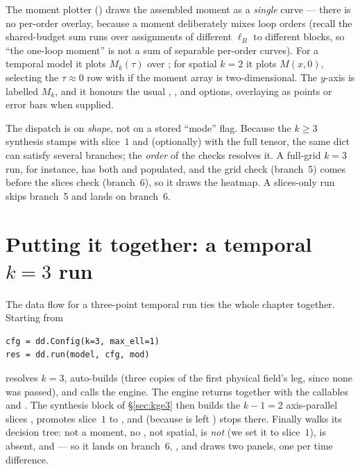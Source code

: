 The moment plotter  () draws
the assembled moment as a \emph{single} curve --- there is no per-order overlay,
because a moment deliberately mixes loop orders (recall the shared-budget sum runs
over assignments of different $\ell_B$ to different blocks, so ``the one-loop
moment'' is not a sum of separable per-order curves). For a temporal model it plots
$M_k(\tau)$ over ; for spatial $k=2$ it plots $M(x,0)$, selecting
the $\tau\approx0$ row with  if the moment array is
two-dimensional. The $y$-axis is labelled $M_k$, and it honours the usual
, , and  options, overlaying  as points
or error bars when supplied.

\begin{note}
The dispatch is on \emph{shape}, not on a stored ``mode'' flag. Because the
$k\ge3$ synthesis stamps  with slice~$1$ and (optionally)
 with the full tensor, the same dict can satisfy several
branches; the \emph{order} of the checks resolves it. A full-grid $k=3$ run, for
instance, has both  and  populated, and the
grid check (branch~5) comes before the slices check (branch~6), so it draws the
heatmap. A slices-only run skips branch~5 and lands on branch~6.
\end{note}

\section{Putting it together: a temporal \texorpdfstring{$k=3$}{k=3} run}

The data flow for a three-point temporal run ties the whole chapter together.
Starting from

\begin{lstlisting}
cfg = dd.Config(k=3, max_ell=1)
res = dd.run(model, cfg, mod)
\end{lstlisting}

 resolves $k=3$, auto-builds 
(three copies of the first physical field's leg, since none was passed), and calls
the engine. The engine returns  together with the callables
 and . The synthesis block of
\S\ref{sec:kge3} then builds the $k-1=2$ axis-parallel slices
, promotes slice~$1$ to ,
and (because  is left ) stops there. Finally
 walks its decision tree: not a moment, no ,
not spatial,  is \emph{not}  (we set it to slice~$1$),
 is absent, and  --- so it
lands on branch~6, , and draws two panels, one
per time difference.

